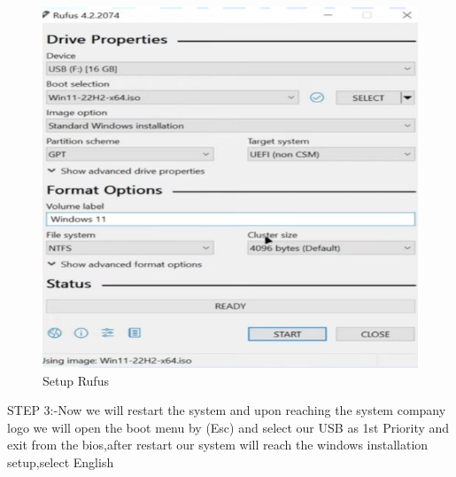 \documentclass[a4paper,9pt]{article}
\begin{document}
\begin{enumerate}
			\begin{figure}[H]
			\centering
			\includegraphics[width=0.8\linewidth]{1.3.png}
			\caption{Setup Rufus}
		\end{figure}
		STEP 3:-Now we will restart the system and upon reaching the system company logo we will open the boot menu by (Esc) and select our USB as 1st Priority and exit from the bios,after restart our system will reach the windows installation setup,select English
		

\end{enumerate}
\end{document}

